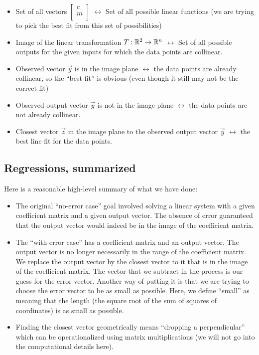 \documentclass[10pt]{amsart}
\begin{document}
\begin{itemize}
\item Set of all vectors $\left[\begin{matrix} c \\ m
    \\\end{matrix}\right]$ $\leftrightarrow$ Set of all possible
  linear functions (we are trying to pick the best fit from this set
  of possibilities)
\item Image of the linear transformation $T: \mathbb{R}^2 \to \mathbb{R}^n$
  $\leftrightarrow$ Set of all possible outputs for the given inputs
  for which the data points are collinear.
\item Observed vector $\vec{y}$ is in the image plane
  $\leftrightarrow$ the data points are already collinear, so the
  ``best fit'' is obvious (even though it still may not be the correct
  fit)
\item Observed output vector $\vec{y}$ is not in the image plane
  $\leftrightarrow$ the data points are not already collinear.
\item Closest vector $\vec{z}$ in the image plane to the observed
  output vector $\vec{y}$ $\leftrightarrow$ the best line fit for the
  data points.
\end{itemize}

\subsection{Regressions, summarized}

Here is a reasonable high-level summary of what we have done:

\begin{itemize}
\item The original ``no-error case'' goal involved solving a linear
  system with a given coefficient matrix and a given output
  vector. The absence of error guaranteed that the output vector would
  indeed be in the image of the coefficient matrix.
\item The ``with-error case'' has a coefficient matrix and an output
  vector. The output vector is no longer necessarily in the range of
  the coefficient matrix. We replace the output vector by the closest
  vector to it that is in the image of the coefficient matrix. The
  vector that we subtract in the process is our guess for the error
  vector. Another way of putting it is that we are trying to choose
  the error vector to be as small as possible. Here, we define
  ``small'' as meaning that the length (the square root of the sum of
  squares of coordinates) is as small as possible.
\item Finding the closest vector geometrically means ``dropping a
  perpendicular'' which can be operationalized using matrix
  multiplications (we will not go into the computational details
  here).
\end{itemize}
\end{document}
